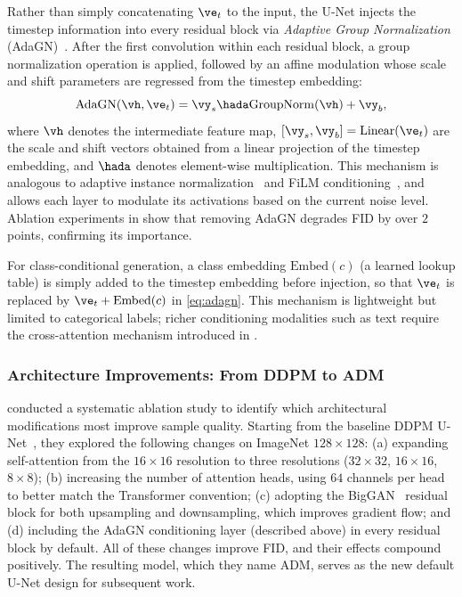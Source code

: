 \documentclass[../../book-main.tex]{subfiles}
\begin{document}
Rather than simply concatenating \(\ve_t\) to the input, the U-Net injects the timestep information into every residual block via \textit{Adaptive Group Normalization} (AdaGN)~\citep{dhariwal2021diffusion}.
After the first convolution within each residual block, a group normalization operation is applied, followed by an affine modulation whose scale and shift parameters are regressed from the timestep embedding:
\begin{equation}
    \mathrm{AdaGN}(\vh, \ve_t) = \vy_s \hada \mathrm{GroupNorm}(\vh) + \vy_b ,
    \label{eq:adagn}
\end{equation}
where \(\vh\) denotes the intermediate feature map, \([\vy_s, \vy_b] = \mathrm{Linear}(\ve_t)\) are the scale and shift vectors obtained from a linear projection of the timestep embedding, and \(\hada\) denotes element-wise multiplication.
This mechanism is analogous to adaptive instance normalization~\citep{dumoulin2017learned} and FiLM conditioning~\citep{perez2018film}, and allows each layer to modulate its activations based on the current noise level.
Ablation experiments in \citet{dhariwal2021diffusion} show that removing AdaGN degrades FID by over \(2\) points, confirming its importance.

For class-conditional generation, a class embedding \(\mathrm{Embed}(c)\) (a learned lookup table) is simply added to the timestep embedding before injection, so that \(\ve_t\) is replaced by \(\ve_t + \mathrm{Embed}(c)\) in \eqref{eq:adagn}.
This mechanism is lightweight but limited to categorical labels; richer conditioning modalities such as text require the cross-attention mechanism introduced in .

\subsubsection{Architecture Improvements: From DDPM to ADM}
\label{sec:unet-adm}

\citet{dhariwal2021diffusion} conducted a systematic ablation study to identify which architectural modifications most improve sample quality.
Starting from the baseline DDPM U-Net~\citep{ho2020denoising}, they explored the following changes on ImageNet \(128 \times 128\): (a) expanding self-attention from the \(16 \times 16\) resolution to three resolutions (\(32 \times 32\), \(16 \times 16\), \(8 \times 8\));
(b) increasing the number of attention heads, using \(64\) channels per head to better match the Transformer convention;
(c) adopting the BigGAN~\citep{brock2019large} residual block for both upsampling and downsampling, which improves gradient flow;
and (d) including the AdaGN conditioning layer (described above) in every residual block by default.
All of these changes improve FID, and their effects compound positively.
The resulting model, which they name ADM, serves as the new default U-Net design for subsequent work.
\end{document}
